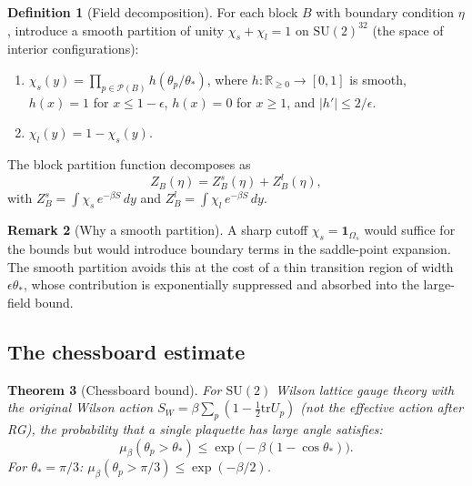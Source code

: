 \documentclass[11pt]{article}
\newtheorem{theorem}{Theorem}[section]
\theoremstyle{definition}
\newtheorem{definition}[theorem]{Definition}
\newtheorem{remark}[theorem]{Remark}
\newcommand{\SU}{\mathrm{SU}}
\newcommand{\tr}{\mathrm{tr}}
\newcommand{\R}{\mathbb{R}}
\begin{document}
\begin{definition}[Field decomposition]\label{def:decomp}
For each block $B$ with boundary condition $\eta$, introduce a smooth
partition of unity $\chi_s+\chi_l=1$ on $\SU(2)^{32}$ (the space of
interior configurations):
\begin{enumerate}[nosep,label=(\roman*)]
\item $\chi_s(y)=\prod_{p\in\mathcal{P}(B)}h(\theta_p/\theta_*)$,
where $h:\R_{\ge 0}\to[0,1]$ is smooth, $h(x)=1$ for $x\le 1-\epsilon$,
$h(x)=0$ for $x\ge 1$, and $|h'|\le 2/\epsilon$.
\item $\chi_l(y)=1-\chi_s(y)$.
\end{enumerate}
The block partition function decomposes as
\begin{equation}\label{eq:Z-decomp}
Z_B(\eta)=Z_B^s(\eta)+Z_B^l(\eta),
\end{equation}
with $Z_B^s=\int\chi_s\,e^{-\beta S}\,dy$ and
$Z_B^l=\int\chi_l\,e^{-\beta S}\,dy$.
\end{definition}

\begin{remark}[Why a smooth partition]
A sharp cutoff $\chi_s=\mathbf{1}_{\Omega_s}$ would suffice for the
bounds but would introduce boundary terms in the saddle-point expansion.
The smooth partition avoids this at the cost of a thin transition region
of width $\epsilon\theta_*$, whose contribution is exponentially
suppressed and absorbed into the large-field bound.
\end{remark}

\subsection{The chessboard estimate}

\begin{theorem}[Chessboard bound]\label{thm:chess}
For $\SU(2)$ Wilson lattice gauge theory with the \emph{original}
Wilson action $S_W=\beta\sum_p(1-\frac{1}{2}\tr U_p)$
(not the effective action after RG), the probability that a single
plaquette has large angle satisfies:
\begin{equation}\label{eq:chess}
\mu_\beta(\theta_p>\theta_*)
\le\exp\bigl(-\beta(1-\cos\theta_*)\bigr).
\end{equation}
For $\theta_*=\pi/3$: $\mu_\beta(\theta_p>\pi/3)
\le\exp(-\beta/2)$.
\end{theorem}
\end{document}
